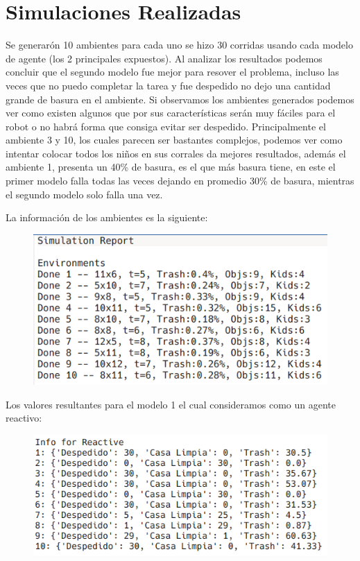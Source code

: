 \documentclass[a4paper,10pt,twocolumn]{article}
\begin{document}
\section*{Simulaciones Realizadas}

Se generar\'on 10 ambientes para cada uno se hizo 30 corridas usando cada modelo de agente (los 2 principales expuestos). Al analizar los resultados podemos concluir que el segundo modelo fue mejor para resover el problema, incluso las veces que no puedo completar la tarea y fue despedido no dejo una cantidad grande de basura en el ambiente. Si observamos los ambientes generados podemos ver como existen algunos que por sus caracter\'isticas ser\'an muy f\'aciles para el robot o no habr\'a forma que consiga evitar ser despedido. Principalmente el ambiente 3 y 10, los cuales parecen ser bastantes complejos, podemos ver como intentar colocar todos los ni\~nos en sus corrales da mejores resultados, adem\'as el ambiente 1, presenta un 40\% de basura, es el que m\'as basura tiene, en este el primer modelo falla todas las veces dejando en promedio 30\% de basura, mientras el segundo modelo solo falla una vez.

La informaci\'on de los ambientes es la siguiente:

\begin{figure}[h]
	\includegraphics[scale=0.67]{./imgs/envs}
\end{figure}

Los valores resultantes para el modelo 1 el cual consideramos como un agente reactivo:

\begin{figure}[h]
	\includegraphics[scale=0.65]{./imgs/reactive}
\end{figure}
\end{document}
